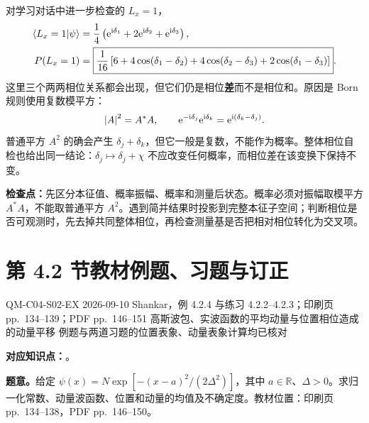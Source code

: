 \begin{checkedsolution}
对学习对话中进一步检查的 $L_x=1$，
\begin{align}
  \left\langle L_x=1 \middle| \psi \right\rangle
  &=\frac14\left(
    \mathrm{e}^{\mathrm{i}\delta_1}
    +2\mathrm{e}^{\mathrm{i}\delta_2}
    +\mathrm{e}^{\mathrm{i}\delta_3}
  \right),
  \label{eq:QM-C04-S01-E01-Lx1-phase-amplitude}\\
  P(L_x=1)
  &=\boxed{\frac1{16}\left[
    6
    +4\cos(\delta_1-\delta_2)
    +4\cos(\delta_2-\delta_3)
    +2\cos(\delta_1-\delta_3)
  \right]}.
  \label{eq:QM-C04-S01-E01-Lx1-phase-probability}
\end{align}
这里三个两两相位关系都会出现，但它们仍是相位\textbf{差}而不是相位和。原因是 Born 规则使用复数模平方：
\begin{equation}
  \left|A\right|^2=A^*A,
  \qquad
  \mathrm{e}^{-\mathrm{i}\delta_j}\mathrm{e}^{\mathrm{i}\delta_k}
  =\mathrm{e}^{\mathrm{i}(\delta_k-\delta_j)}.
  \label{eq:QM-C04-S01-E01-modulus-square-phase-difference}
\end{equation}
普通平方 $A^2$ 的确会产生 $\delta_j+\delta_k$，但它一般是复数，不能作为概率。整体相位自检也给出同一结论：$\delta_j\mapsto\delta_j+\chi$ 不应改变任何概率，而相位差在该变换下保持不变。
\end{checkedsolution}

\textbf{检查点：}先区分本征值、概率振幅、概率和测量后状态。概率必须对振幅取模平方 $A^*A$，不能取普通平方 $A^2$。遇到简并结果时投影到完整本征子空间；判断相位是否可观测时，先去掉共同整体相位，再检查测量基是否把相对相位转化为交叉项。

\section{第 4.2 节教材例题、习题与订正}
\label{exercise-set:QM-C04-S02}

\exercisemeta
  {QM-C04-S02-EX}
  {2026-09-10}
  {Shankar，例 4.2.4 与练习 4.2.2--4.2.3；印刷页 pp.~134--139；PDF pp.~146--151}
  {高斯波包、实波函数的平均动量与位置相位造成的动量平移}
  {例题与两道习题的位置表象、动量表象计算均已核对}


\textbf{对应知识点：}。

\textbf{题意。}给定 $\psi(x)=N\exp[-(x-a)^2/(2\Delta^2)]$，其中 $a\in\mathbb R$、$\Delta>0$。求归一化常数、动量波函数、位置和动量的均值及不确定度。教材位置：印刷页 pp.~134--138，PDF pp.~146--150。

